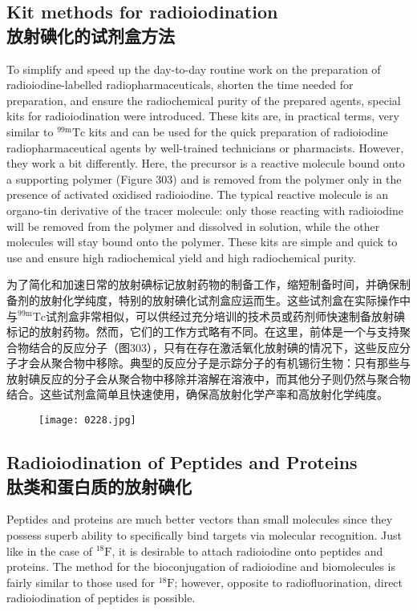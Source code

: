 \documentclass[dvipsnames, svgnames,a4paper,11pt]{article}
\begin{document}
\subsection{Kit methods for radioiodination\\ 放射碘化的试剂盒方法}  
To simplify and speed up the day-to-day routine work on the preparation of radioiodine-labelled radiopharmaceuticals, shorten the time needed for preparation, and ensure the radiochemical purity of the prepared agents, special kits for radioiodination were introduced. These kits are, in practical terms, very similar to \(\mathrm{^{99m}Tc}\) kits and can be used for the quick preparation of radioiodine radiopharmaceutical agents by well-trained technicians or pharmacists. However, they work a bit differently. Here, the precursor is a reactive molecule bound onto a supporting polymer (Figure 303) and is removed from the polymer only in the presence of activated oxidised radioiodine. The typical reactive molecule is an organo-tin derivative of the tracer molecule: only those reacting with radioiodine will be removed from the polymer and dissolved in solution, while the other molecules will stay bound onto the polymer. These kits are simple and quick to use and ensure high radiochemical yield and high radiochemical purity.

为了简化和加速日常的放射碘标记放射药物的制备工作，缩短制备时间，并确保制备剂的放射化学纯度，特别的放射碘化试剂盒应运而生。这些试剂盒在实际操作中与\(\mathrm{^{99m}Tc}\)试剂盒非常相似，可以供经过充分培训的技术员或药剂师快速制备放射碘标记的放射药物。然而，它们的工作方式略有不同。在这里，前体是一个与支持聚合物结合的反应分子（图303），只有在存在激活氧化放射碘的情况下，这些反应分子才会从聚合物中移除。典型的反应分子是示踪分子的有机锡衍生物：只有那些与放射碘反应的分子会从聚合物中移除并溶解在溶液中，而其他分子则仍然与聚合物结合。这些试剂盒简单且快速使用，确保高放射化学产率和高放射化学纯度。

\begin{figure}[h]
	\centering
    \texttt{[image: 0228.jpg]}  
     \label{fig303}
\end{figure}


\subsection{Radioiodination of Peptides and Proteins\\ 肽类和蛋白质的放射碘化}  
Peptides and proteins are much better vectors than small molecules since they possess superb ability to specifically bind targets via molecular recognition. Just like in the case of \(\mathrm{^{18}F}\), it is desirable to attach radioiodine onto peptides and proteins. The method for the bioconjugation of radioiodine and biomolecules is fairly similar to those used for \(\mathrm{^{18}F}\); however, opposite to radiofluorination, direct radioiodination of peptides is possible.
\end{document}
